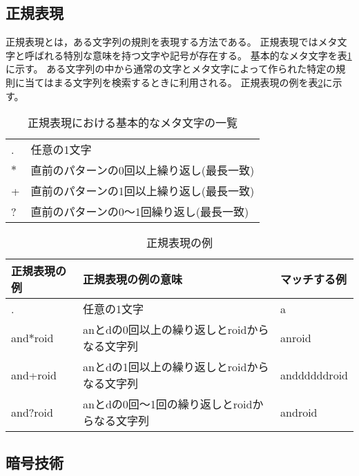 \subsection{正規表現}

正規表現とは，ある文字列の規則を表現する方法である。
正規表現ではメタ文字と呼ばれる特別な意味を持つ文字や記号が存在する。
基本的なメタ文字を表\ref{tb:RegularExpression}に示す。
ある文字列の中から通常の文字とメタ文字によって作られた特定の規則に当てはまる文字列を検索するときに利用される。
正規表現の例を表\ref{tb:RegularExpression2}に示す。

\begin{table}[t]
\begin{center}
\caption{正規表現における基本的なメタ文字の一覧}
\begin{tabular}{ll} \hline
. & 任意の1文字 \\
$\ast$ & 直前のパターンの0回以上繰り返し(最長一致) \\
+ & 直前のパターンの1回以上繰り返し(最長一致) \\
? & 直前のパターンの0～1回繰り返し(最長一致) \\ \hline
\end{tabular}
\label{tb:RegularExpression}
\end{center}
\end{table}

\begin{table}[t]
\begin{center}
\caption{正規表現の例}
\begin{tabular}{lll} \hline
正規表現の例 & 正規表現の例の意味 & マッチする例 \\ \hline
. & 任意の1文字 & a \\
and$\ast$roid & anとdの0回以上の繰り返しとroidからなる文字列 & anroid \\
and+roid & anとdの1回以上の繰り返しとroidからなる文字列 & anddddddroid \\
and?roid & anとdの0回～1回の繰り返しとroidからなる文字列 & android \\ \hline
\end{tabular}
\label{tb:RegularExpression2}
\end{center}
\end{table}

\subsection{暗号技術}


